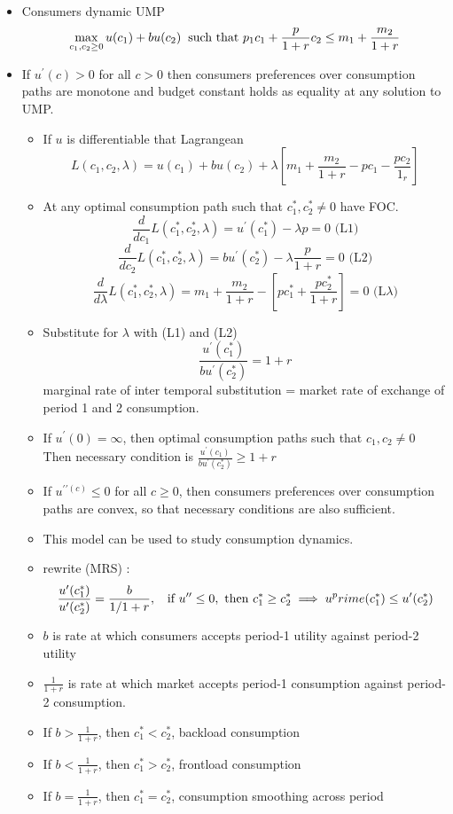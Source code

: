 \documentclass[twoside]{article}
\begin{document}
\begin{itemize}
\item Consumers dynamic UMP 
\[\max_{c_1, c_2 \geq 0} u(c_1) + b u(c_2) \hspace{0.2cm} \text{such that } p_1c_1 + \frac{p}{1+r} c_2 \leq m_1 + \frac{m_2}{1+r}\]
\item If \(u^\prime(c) > 0\) for all \(c > 0\) then consumers preferences over consumption paths are monotone and budget constant holds as equality at any solution to UMP.
\begin{itemize}
\item If \(u\) is differentiable that Lagrangean
\[L(c_1, c_2, \lambda) = u(c_1) + b u(c_2) + \lambda\left[m_1 + \frac{m_2}{1+r} - pc_1 - \frac{pc_2}{1_r}\right]\]
\item At any optimal consumption path such that \(c_1^*, c_2^* \neq 0 \) have FOC. 
\[\frac{d}{dc_1} L(c_1^*, c_2^*, \lambda) = u^\prime(c_1^*) -\lambda p = 0 \text{ (L1)}\]
\[\frac{d}{dc_2} L(c_1^*, c_2^*, \lambda) = bu^\prime(c_2^*) -\lambda \frac{p}{1+r} = 0 \text{ (L2)}\]
\[\frac{d}{d\lambda} L(c_1^*, c_2^*, \lambda) = m_1 + \frac{m_2}{1+r} - [pc_1^* + \frac{pc_2^*}{1+r}] = 0 \text{ (L}\lambda)\]
\item Substitute for \(\lambda\) with (L1) and (L2)
\[\frac{u^\prime(c_1^*)}{bu^\prime(c_2^*)} = 1+r\]
marginal rate of inter temporal substitution = market rate of exchange of period 1 and 2 consumption. 
\item If \(u^\prime(0) = \infty\), then optimal consumption paths such that \(c_1, c_2 \neq 0\)\\
Then necessary condition is \(\frac{u^\prime(c_1)}{bu^\prime (c_2^*)} \geq  1 + r \)
\item If \(u^{\prime \prime(c)} \leq 0 \) for all \( c \geq 0\), then consumers preferences over consumption paths are convex, so that necessary conditions are also sufficient. 
\item This model can be used to study consumption dynamics. 
\item rewrite (MRS) : 
\[\frac{u^\prime(c_1^*)}{u^\prime(c_2^*)} = \frac{b}{1 / 1 + r}, \hspace{0.2cm} \text{ if } u^{\prime \prime} \leq 0, \text{ then } c_1^* \geq c_2^* \implies u^prime(c_1^*) \leq u^\prime(c_2^*)\]
\item \(b\) is rate at which consumers accepts period-1 utility against period-2 utility
\item \(\frac{1}{1+r}\) is rate at which market accepts period-1 consumption against period-2 consumption. 
\item If \(b > \frac{1}{1+r}\), then \(c_1^* < c_2^*\), backload consumption
\item If \(b < \frac{1}{1+r}\), then \(c_1^* > c_2^*\), frontload consumption
\item If \(b = \frac{1}{1+r}\), then \(c_1^* = c_2^*\), consumption smoothing across period
\end{itemize}



 
\end{itemize}
\end{document}

